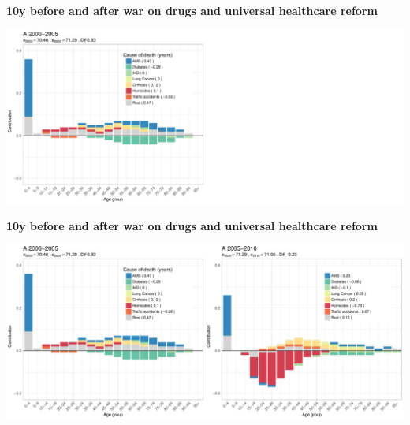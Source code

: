 \documentclass[xcolor={dvipsnames}]{beamer}
\begin{document}
\begin{frame}
\begin{center}
\Large{\textbf{10y before and after war on drugs and universal healthcare reform}}
\end{center}

\hspace*{-1cm}   
\includegraphics[scale=.31]{Figures/Fig2_1}

\end{frame}

\begin{frame}
\begin{center}
\Large{\textbf{10y before and after war on drugs and universal healthcare reform}}
\end{center}

\hspace*{-1cm}   
\includegraphics[scale=.31]{Figures/Fig2_2}

\end{frame}
\end{document}
